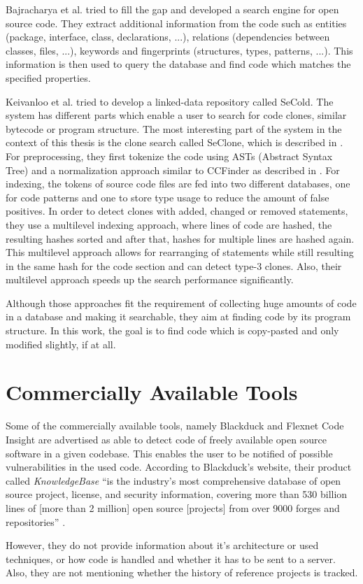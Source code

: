 Bajracharya et al. \cite{bajracharya2006sourcerer} tried to fill the gap and developed a search engine for open source code.
They extract additional information from the code such as entities (package, interface, class, declarations, ...), relations (dependencies between classes, files, ...), keywords and fingerprints (structures, types, patterns, ...).
This information is then used to query the database and find code which matches the specified properties.

Keivanloo et al. \cite{keivanloo2012leveraging,keivanloo2011internet,keivanloo2011seclone,keivanloo2010semantic} tried to develop a linked-data repository called SeCold.
The system has different parts which enable a user to search for code clones, similar bytecode or program structure.
The most interesting part of the system in the context of this thesis is the clone search called SeClone, which is described in \cite{keivanloo2011internet,keivanloo2011seclone}.
For preprocessing, they first tokenize the code using ASTs (Abstract Syntax Tree) and a normalization approach similar to CCFinder as described in \cite{kamiya2002ccfinder}.
For indexing, the tokens of source code files are fed into two different databases, one for code patterns and one to store type usage to reduce the amount of false positives.
In order to detect clones with added, changed or removed statements, they use a multilevel indexing approach, where lines of code are hashed, the resulting hashes sorted and after that, hashes for multiple lines are hashed again.
This multilevel approach allows for rearranging of statements while still resulting in the same hash for the code section and can detect type-3 clones.
Also, their multilevel approach speeds up the search performance significantly.

Although those approaches fit the requirement of collecting huge amounts of code in a database and making it searchable, they aim at finding code by its program structure.
In this work, the goal is to find code which is copy-pasted and only modified slightly, if at all.

\section{Commercially Available Tools}
Some of the commercially available tools, namely Blackduck and Flexnet Code Insight are advertised as able to detect code of freely available open source software in a given codebase.
This enables the user to be notified of possible vulnerabilities in the used code.
According to Blackduck's website, their product called \textit{KnowledgeBase} \enquote{is the industry’s most comprehensive database of open source project, license, and security information, covering more than 530 billion lines of [more than 2 million] open source [projects] from over 9000 forges and repositories} \cite{blackduck}.

However, they do not provide information about it's architecture or used techniques, or how code is handled and whether it has to be sent to a server.
Also, they are not mentioning whether the history of reference projects is tracked.